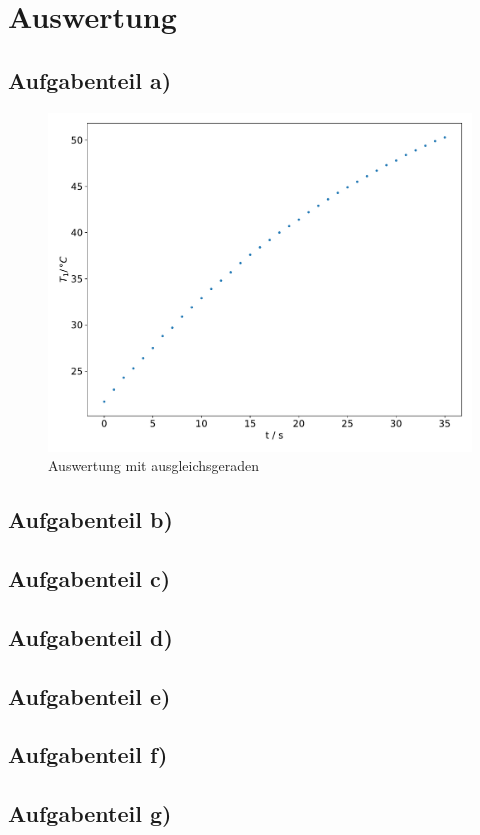    \newpage
    \section{Auswertung}
        \subsection{Aufgabenteil a)}
        \begin{figure}
               \centering
               \includegraphics[width=\textwidth]{grafic.pdf}
               \caption{Auswertung mit ausgleichsgeraden}
               \label{fig:grafic}
        \end{figure}


            

        \subsection{Aufgabenteil b)}


        \subsection{Aufgabenteil c)}


        \subsection{Aufgabenteil d)}


        \subsection{Aufgabenteil e)}


        \subsection{Aufgabenteil f)}


        \subsection{Aufgabenteil g)}
